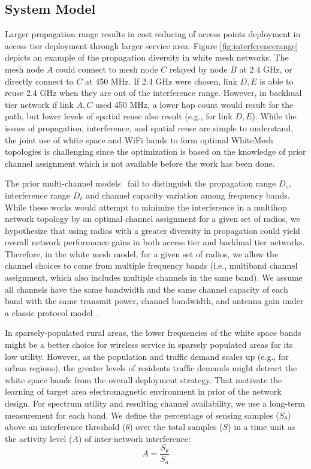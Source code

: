 \subsection{System Model}
\label{subsec:problem}
Larger propagation range results in cost reducing of access points deployment in access 
tier deployment through larger service area. Figure \ref{fig:interferencerange} depicts 
an example of the propagation diversity in white mesh networks. The mesh node $A$ 
could connect to mesh node $C$ relayed by node $B$ at 2.4 GHz, or directly connect to $C$ at 450 
MHz. If 2.4 GHz were chosen, link $D,E$ is able to reuse 2.4 GHz when they are out of 
the interference range. However, in backhual tier network if link $A,C$ used 450 MHz, a 
lower hop count would result for the path, but lower levels of spatial reuse also result 
(e.g., for link $D,E$). While the issues of propagation, interference, and spatial reuse are 
simple to understand, the joint use of white space and WiFi bands to form optimal WhiteMesh 
topologies is challenging since the optimization is based on the knowledge of prior channel 
assignment which is not available before the work has been done.

The prior multi-channel models~\cite{tang2005interference, doraghinejad2014channel} fail to 
distinguish the propagation range $D_c$, interference range $D_r$ and channel capacity variation 
among frequency bands. While these works would attempt to minimize the interference in a multihop 
network topology by an optimal channel assignment for a given set of radios, we hypothesize that
using radios with a greater diversity in propagation could yield overall network performance gains
in both access tier and backhual tier networks. Therefore, in the white mesh model, for a given set 
of radios, we allow the channel choices to come from multiple frequency bands (i.e., multiband channel 
assignment, which also includes multiple channels in the same band). We assume all channels have 
the same bandwidth and the same channel capacity of each band with the same transmit power, channel 
bandwidth, and antenna gain under a classic protocol model~\cite{gupta2000capacity}. 

In sparsely-populated rural areas, the lower frequencies of the white space bands might be a better 
choice for wireless service in sparsely populated areas for its low utility. However, as the population 
and traffic demand scales up (e.g., for urban regions), the greater levels of residents traffic demands 
might detract the white space bands from the overall deployment strategy. That motivate the learning of 
target area electromagnetic environment in prior of the network design. For spectrum utility and 
resulting channel availability, we use a long-term measurement for each band.  We define the percentage 
of sensing samples ($S_\theta$) above an interference threshold ($\theta$) over the total samples ($S$) 
in a time unit as the activity level ($A$) of inter-network interference:
\begin{equation}
\label{eq:actdef}
A=\frac{S_\theta}{S_a}
\end{equation}

